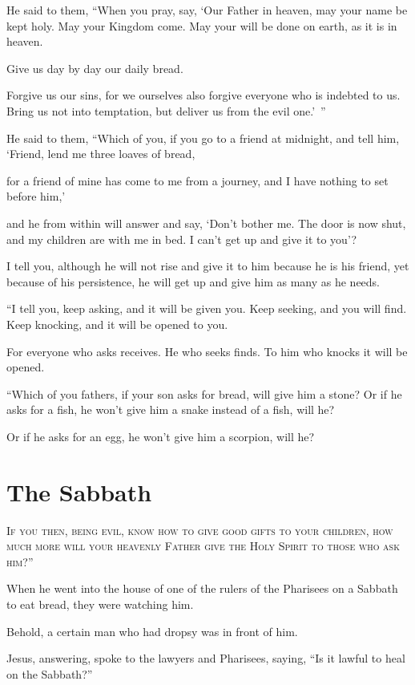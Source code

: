 He said to them, “When you pray, say, ‘Our Father in heaven, may your name be kept holy. May your Kingdom come. May your will be done on earth, as it is in heaven.

Give us day by day our daily bread.

Forgive us our sins, for we ourselves also forgive everyone who is indebted to us. Bring us not into temptation, but deliver us from the evil one.’ ”

He said to them, “Which of you, if you go to a friend at midnight, and tell him, ‘Friend, lend me three loaves of bread,

for a friend of mine has come to me from a journey, and I have nothing to set before him,’

and he from within will answer and say, ‘Don’t bother me. The door is now shut, and my children are with me in bed. I can’t get up and give it to you’?

I tell you, although he will not rise and give it to him because he is his friend, yet because of his persistence, he will get up and give him as many as he needs.

“I tell you, keep asking, and it will be given you. Keep seeking, and you will find. Keep knocking, and it will be opened to you.

For everyone who asks receives. He who seeks finds. To him who knocks it will be opened.

“Which of you fathers, if your son asks for bread, will give him a stone? Or if he asks for a fish, he won’t give him a snake instead of a fish, will he?

Or if he asks for an egg, he won’t give him a scorpion, will he?


\clearpage \section*{The Sabbath}

\lettrine{I}{f you then, being evil, know how to give good gifts to your children, how much more will your heavenly Father give the Holy Spirit to those who ask him?”}

When he went into the house of one of the rulers of the Pharisees on a Sabbath to eat bread, they were watching him.

Behold, a certain man who had dropsy was in front of him.

Jesus, answering, spoke to the lawyers and Pharisees, saying, “Is it lawful to heal on the Sabbath?”


